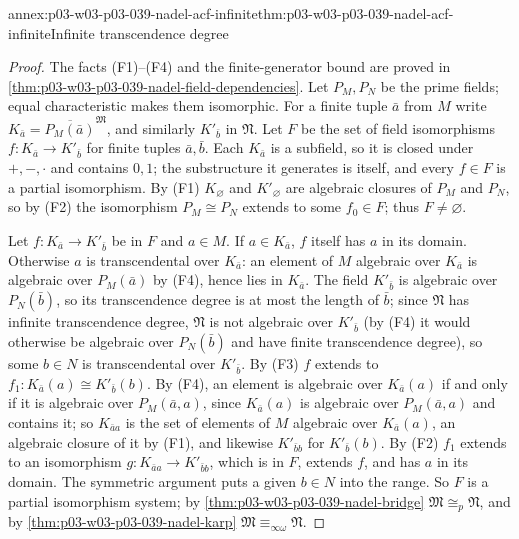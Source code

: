 \begin{annexitem}{annex:p03-w03-p03-039-nadel-acf-infinite}{thm:p03-w03-p03-039-nadel-acf-infinite}{Infinite transcendence degree}
\begin{proof}
The facts (F1)--(F4) and the finite-generator bound are proved in
\cref{thm:p03-w03-p03-039-nadel-field-dependencies}.
Let \(P_M,P_N\) be the prime fields; equal characteristic makes them
isomorphic. For a finite tuple \(\bar a\) from \(M\) write
\(K_{\bar a}=\overline{P_M(\bar a)}^{\mathfrak M}\), and similarly
\(K'_{\bar b}\) in \(\mathfrak N\). Let \(F\) be the set of field isomorphisms
\(f:K_{\bar a}\to K'_{\bar b}\) for finite tuples \(\bar a,\bar b\). Each
\(K_{\bar a}\) is a subfield, so it is closed under \(+,-,\cdot\) and contains
\(0,1\); the substructure it generates is itself, and every \(f\in F\) is a
partial isomorphism. By (F1) \(K_\varnothing\) and \(K'_\varnothing\) are
algebraic closures of \(P_M\) and \(P_N\), so by (F2) the isomorphism
\(P_M\cong P_N\) extends to some \(f_0\in F\); thus \(F\ne\varnothing\).

Let \(f:K_{\bar a}\to K'_{\bar b}\) be in \(F\) and \(a\in M\). If
\(a\in K_{\bar a}\), \(f\) itself has \(a\) in its domain. Otherwise \(a\) is
transcendental over \(K_{\bar a}\): an element of \(M\) algebraic over
\(K_{\bar a}\) is algebraic over \(P_M(\bar a)\) by (F4), hence lies in
\(K_{\bar a}\). The field \(K'_{\bar b}\) is algebraic over \(P_N(\bar b)\),
so its transcendence degree is at most the length of \(\bar b\); since
\(\mathfrak N\) has infinite transcendence degree, \(\mathfrak N\) is not
algebraic over \(K'_{\bar b}\) (by (F4) it would otherwise be algebraic over
\(P_N(\bar b)\) and have finite transcendence degree), so some \(b\in N\) is
transcendental over \(K'_{\bar b}\). By (F3) \(f\) extends to
\(f_1:K_{\bar a}(a)\cong K'_{\bar b}(b)\). By (F4), an element is algebraic
over \(K_{\bar a}(a)\) if and only if it is algebraic over \(P_M(\bar a,a)\),
since \(K_{\bar a}(a)\) is algebraic over \(P_M(\bar a,a)\) and contains it;
so \(K_{\bar aa}\) is the set of elements of \(M\) algebraic over
\(K_{\bar a}(a)\), an algebraic closure of it by (F1), and likewise
\(K'_{\bar bb}\) for \(K'_{\bar b}(b)\). By (F2) \(f_1\) extends to an
isomorphism \(g:K_{\bar aa}\to K'_{\bar bb}\), which is in \(F\), extends
\(f\), and has \(a\) in its domain. The symmetric argument puts a given
\(b\in N\) into the range. So \(F\) is a partial isomorphism system; by
\cref{thm:p03-w03-p03-039-nadel-bridge} \(\mathfrak M\cong_p\mathfrak N\),
and by \cref{thm:p03-w03-p03-039-nadel-karp}
\(\mathfrak M\equiv_{\infty\omega}\mathfrak N\).
\end{proof}
\end{annexitem}

